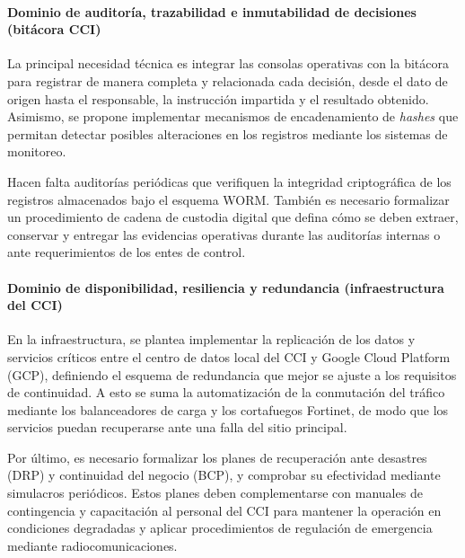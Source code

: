 \paragraph{Dominio de auditoría, trazabilidad e inmutabilidad de decisiones (bitácora CCI)}%
La principal necesidad técnica es integrar las consolas operativas con la bitácora para registrar de manera completa y relacionada cada decisión, desde el dato de origen hasta el responsable, la instrucción impartida y el resultado obtenido. Asimismo, se propone implementar mecanismos de encadenamiento de \textit{hashes} que permitan detectar posibles alteraciones en los registros mediante los sistemas de monitoreo.

Hacen falta auditorías periódicas que verifiquen la integridad criptográfica de los registros almacenados bajo el esquema WORM. También es necesario formalizar un procedimiento de cadena de custodia digital que defina cómo se deben extraer, conservar y entregar las evidencias operativas durante las auditorías internas o ante requerimientos de los entes de control.

\paragraph{Dominio de disponibilidad, resiliencia y redundancia (infraestructura del CCI)}%
En la infraestructura, se plantea implementar la replicación de los datos y servicios críticos entre el centro de datos local del CCI y Google Cloud Platform (GCP), definiendo el esquema de redundancia que mejor se ajuste a los requisitos de continuidad. A esto se suma la automatización de la conmutación del tráfico mediante los balanceadores de carga y los cortafuegos Fortinet, de modo que los servicios puedan recuperarse ante una falla del sitio principal.

Por último, es necesario formalizar los planes de recuperación ante desastres (DRP) y continuidad del negocio (BCP), y comprobar su efectividad mediante simulacros periódicos. Estos planes deben complementarse con manuales de contingencia y capacitación al personal del CCI para mantener la operación en condiciones degradadas y aplicar procedimientos de regulación de emergencia mediante radiocomunicaciones.
